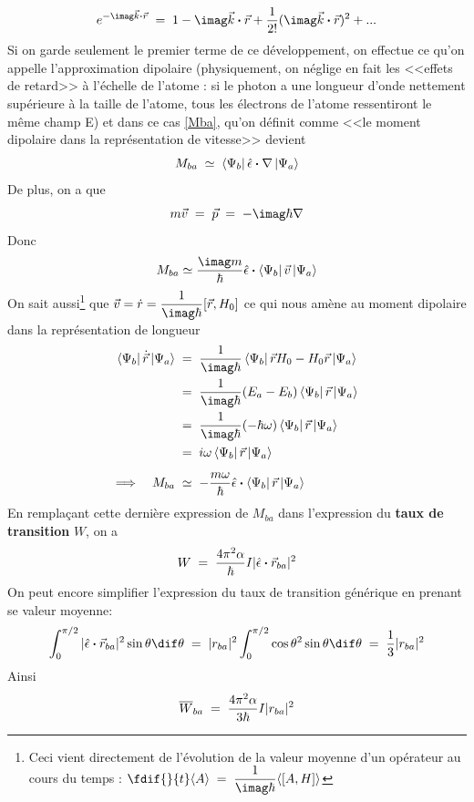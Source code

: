 \begin{equation}
    e^{-\imag\vec{k}\Cdot\vec{r}}\eq 1-\imag\vec{k}\Cdot\vec{r}+\dfrac{1}{2!}(\imag\vec{k}\Cdot\vec{r})^2+...
    \label{eq:dvpl_expo}
\end{equation}
Si on garde seulement le premier terme de ce développement, on effectue ce qu'on appelle l'approximation dipolaire (physiquement, on néglige en fait les <<effets de retard>> à l'échelle de l'atome : si le photon a une longueur d'onde nettement supérieure à la taille de l'atome, tous les électrons de l'atome ressentiront le même champ E) et dans ce cas \eqref{Mba}, qu'on définit comme <<le moment dipolaire dans la représentation de vitesse>> devient
\[
    M_{ba} \;\simeq\; \bra{\Psi_b}\hat{\epsilon}\boldsymbol{\cdot}\nabla\ket{\Psi_a}
\]
De plus, on a que
\[
    m\vec{v}\eq \vec{p}\eq -\imag\hbar \nabla
\]
Donc
\[
    M_{ba} \simeq \dfrac{\imag m}{\hbar}\hat{\epsilon}\Cdot\bra{\Psi_b}\vec{v}\ket{\Psi_a}
\]
On sait aussi\footnote{Ceci vient directement de l'évolution de la valeur moyenne d'un opérateur au cours du temps : $\fdif{}{t}\langle A \rangle \eq \dfrac{1}{\imag\hbar}\langle[A,H] \rangle$} que $\vec{v}=\dot{r}=\dfrac{1}{\imag\hbar}[\vec{r},H_0]$ ce qui nous amène au moment dipolaire dans la représentation de longueur
\begin{align*}
    \bra{\Psi_b}\dot{\vec{r}}\ket{\Psi_a}
    &\eq
    \dfrac{1}{\imag\hbar}\bra{\Psi_b}\vec{r}H_0-H_0\vec{r}\ket{\Psi_a}\\
    &\eq
    \dfrac{1}{\imag\hbar}(E_a-E_b)\bra{\Psi_b}\vec{r}\ket{\Psi_a}\\
    &\eq
    \dfrac{1}{\imag\hbar}(-\hbar \omega)\bra{\Psi_b}\vec{r}\ket{\Psi_a} \\
    &\eq
    i \omega \bra{\Psi_b}\vec{r}\ket{\Psi_a} \\[5pt]
    \Longrightarrow \quad M_{ba} &\;\simeq\;
    -\dfrac{m \omega}{\hbar}\hat{\epsilon}\Cdot\bra{\Psi_b}\vec{r}\ket{\Psi_a}
\end{align*}
En remplaçant cette dernière expression de $M_{ba}$ dans l'expression du \textbf{taux de transition} $W$, on a
\[
    W\; = \; \dfrac{4\pi^2 \alpha}{\hbar}I |\hat{\epsilon}\boldsymbol{\cdot}\vec{r}_{ba}|^2
\]
On peut encore simplifier l'expression du taux de transition générique en prenant se valeur moyenne:
\[
    \int_{0}^{\pi/2} |\hat{\epsilon}\Cdot\vec{r}_{ba}|^2\sin{\theta} \dif\theta\eq |r_{ba}|^2\int_{0}^{\pi/2}\cos{\theta}^2\sin{\theta}\dif\theta\eq \dfrac{1}{3}|r_{ba}|^2
\]
Ainsi
\begin{equation}
    \overline{W}_{ba}\; = \; \dfrac{4\pi^2 \alpha}{3 \hbar}I |r_{ba}|^2
\end{equation}



